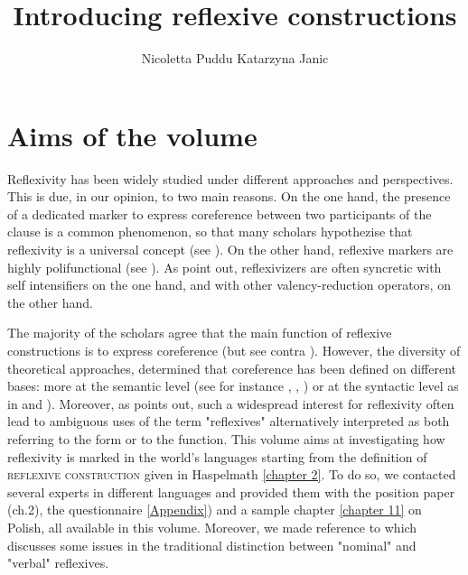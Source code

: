 \documentclass[output=paper]{langscibook}
\author{Nicoletta Puddu \lastand Katarzyna Janic
}
\title{Introducing reflexive constructions}
\begin{document}
\maketitle

\section{Aims of the volume}
Reflexivity has been widely studied under different approaches and perspectives. This is due, in our opinion, to two main reasons. On the one hand, the presence of a dedicated marker to express coreference between two participants of the clause is a common phenomenon, so that many scholars hypothezise that reflexivity is a universal concept (see \citealt{HeineMiyashita2008}). On the other hand, reflexive markers are highly polifunctional (see \citealt{Frajzyngier2000}). As \citealt{KittiläZuñiga2019} point out, reflexivizers are often syncretic with self intensifiers on the one hand, and with other valency-reduction operators, on the other hand.

The majority of the scholars agree that the main function of reflexive constructions is to express coreference (but see contra \citealt{Frajzyngier2000}). However, the diversity of theoretical approaches, determined that coreference has been defined on different bases: more at the semantic level (see for instance \citealt{Lazard2007}, \citealt{Geniusiene1987}, \citealt{KittiläZuñiga2019}) or at the syntactic level as in \citealt{Schladt1999} and \citealt{Everaert2013}).
Moreover, as \citet{Frajzyngier2000} points out, such a widespread interest for reflexivity often lead to ambiguous uses of the term "reflexives" alternatively interpreted as both referring to the form or to the function.  
This volume aims at investigating how reflexivity is marked in the world's languages starting from the definition of \textsc{reflexive} \textsc{construction} given in Haspelmath \ref{chapter 2}. 
To do so, we contacted several experts in different languages and provided them with the position paper (ch.2), the questionnaire \ref{Appendix}) and a sample chapter \ref{chapter 11} on Polish, all available in this volume. Moreover, we made reference to \citealt{Pudduinpress} which discusses some issues in the traditional distinction between "nominal" and "verbal" reflexives.
\end{document}

